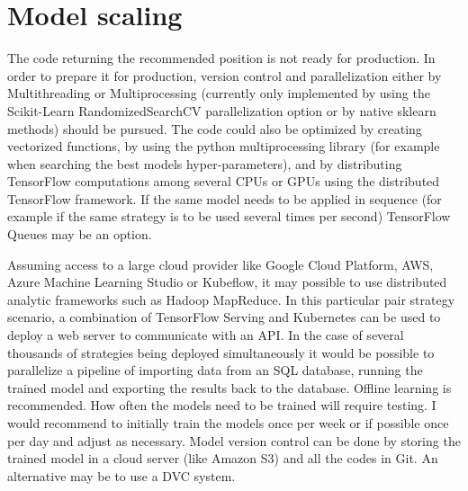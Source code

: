 \documentclass[a4paper,12pt]{article}
\begin{document}
    \hypertarget{scaling}{%
\section{Model scaling}\label{scaling}}

The code returning the recommended position is not ready for production. In order to prepare it for production, version control and parallelization either by Multithreading or Multiprocessing (currently only implemented by using the Scikit-Learn RandomizedSearchCV parallelization option or by native sklearn methods) should be pursued. The code could also be optimized by creating vectorized functions, by using the python multiprocessing library (for example when searching the best models hyper-parameters), and by distributing TensorFlow computations among several CPUs or GPUs using the distributed TensorFlow framework. If the same model needs to be applied in sequence (for example if the same strategy is to be used several times per second) TensorFlow Queues may be an option.

Assuming access to a large cloud provider like Google Cloud Platform, AWS, Azure Machine Learning Studio or Kubeflow, it may possible to use
distributed analytic frameworks such as Hadoop MapReduce. In this particular pair strategy scenario, a combination of TensorFlow Serving and Kubernetes can be used to deploy a web server to communicate with an API. In the case of several thousands of strategies being deployed simultaneously it would be possible to parallelize a pipeline of importing data from an SQL database, running the trained model and exporting the results back to the database. Offline learning is recommended. How often the models need to be trained will require testing. I would recommend to initially train the models once per week or if possible once per day and adjust as necessary. Model version control can be done by storing the trained model in a cloud server (like Amazon S3) and all the codes in Git. An alternative may be to use a DVC system.
    
    
\end{document}
